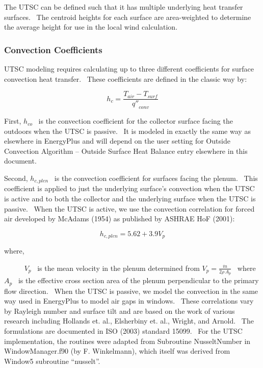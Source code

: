 The UTSC can be defined such that it has multiple underlying heat transfer surfaces.~ The centroid heights for each surface are area-weighted to determine the average height for use in the local wind calculation.

\subsubsection{Convection Coefficients}\label{convection-coefficients-000}

UTSC modeling requires calculating up to three different coefficients for surface convection heat transfer.~ These coefficients are defined in the classic way by:

\begin{equation}
{h_c} = \frac{{{T_{air}} - {T_{surf}}}}{{{{q''}_{conv}}}}
\end{equation}

First, \({h_{co}}\) ~is the convection coefficient for the collector surface facing the outdoors when the UTSC is passive.~ It is modeled in exactly the same way as elsewhere in EnergyPlus and will depend on the user setting for Outside Convection Algorithm -- Outside Surface Heat Balance entry elsewhere in this document.

Second, \({h_{c,plen}}\) ~is the convection coefficient for surfaces facing the plenum.~ This coefficient is applied to just the underlying surface's convection when the UTSC is active and to both the collector and the underlying surface when the UTSC is passive.~ When the UTSC is active, we use the convection correlation for forced air developed by McAdams (1954) as published by ASHRAE HoF (2001):

\begin{equation}
{h_{c,plen}} = 5.62 + 3.9{V_p}
\end{equation}

where,

~~~~~ \({V_p}\) ~is the mean velocity in the plenum determined from \({V_p} = \frac{{\dot m}}{{2\rho \,{A_p}}}\) ~where \({A_p}\) ~is the effective cross section area of the plenum perpendicular to the primary flow direction.~ When the UTSC is passive, we model the convection in the same way used in EnergyPlus to model air gaps in windows.~ These correlations vary by Rayleigh number and surface tilt and are based on the work of various research including Hollands et. al., Elsherbiny et. al., Wright, and Arnold.~ The formulations are documented in ISO (2003) standard 15099.~ For the UTSC implementation, the routines were adapted from Subroutine NusseltNumber in WindowManager.f90 (by F. Winkelmann), which itself was derived from Window5 subroutine ``nusselt''.

